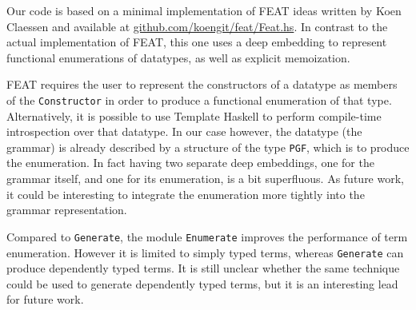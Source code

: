 \documentclass[]{article}
\begin{document}
Our code is based on a minimal implementation of FEAT ideas written by
Koen Claessen and available at
\href{https://github.com/koengit/feat/blob/master/Feat.hs}{github.com/koengit/feat/Feat.hs}.
In contrast to the actual implementation of FEAT, this one uses a deep
embedding to represent functional enumerations of datatypes, as well as
explicit memoization.

FEAT requires the user to represent the constructors of a datatype as
members of the \texttt{Constructor} in order to produce a functional
enumeration of that type. Alternatively, it is possible to use Template
Haskell to perform compile-time introspection over that datatype. In our
case however, the datatype (the grammar) is already described by a
structure of the type \texttt{PGF}, which is to produce the enumeration.
In fact having two separate deep embeddings, one for the grammar itself,
and one for its enumeration, is a bit superfluous. As future work, it
could be interesting to integrate the enumeration more tightly into the
grammar representation.

Compared to \texttt{Generate}, the module \texttt{Enumerate} improves
the performance of term enumeration. However it is limited to simply
typed terms, whereas \texttt{Generate} can produce dependently typed
terms. It is still unclear whether the same technique could be used to
generate dependently typed terms, but it is an interesting lead for
future work.
\end{document}
